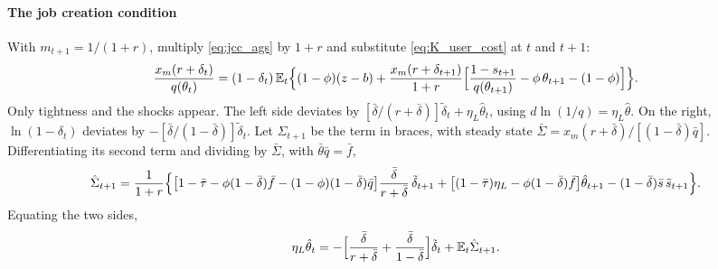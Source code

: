 \documentclass[authoryear, review, 12pt]{elsarticle}
\begin{document}
\paragraph{The job creation condition}
With $m_{t+1}=1/(1+r)$, multiply \eqref{eq:jcc_ags} by $1+r$ and substitute
\eqref{eq:K_user_cost} at $t$ and $t+1$:
\[
	\frac{x_m(r+\delta_t)}{q(\theta_t)}
	=(1-\delta_t)\,\mathbb{E}_t\Bigl\{(1-\phi)(z-b)
	+\frac{x_m(r+\delta_{t+1})}{1+r}\Bigl[\frac{1-s_{t+1}}{q(\theta_{t+1})}-\phi\,\theta_{t+1}-(1-\phi)\Bigr]\Bigr\}.
\]
Only tightness and the shocks appear. The left side deviates by
$[\bar\delta/(r+\bar\delta)]\tilde\delta_t+\eta_L\hat\theta_t$, using
$d\ln(1/q)=\eta_L\hat\theta$. On the right, $\ln(1-\delta_t)$ deviates by
$-[\bar\delta/(1-\bar\delta)]\tilde\delta_t$. Let $\Sigma_{t+1}$ be the term in braces, with
steady state $\bar\Sigma=x_m(r+\bar\delta)/[(1-\bar\delta)\bar{q}]$. Differentiating its second
term and dividing by $\bar\Sigma$, with $\bar\theta\bar{q}=\bar{f}$,
\[
	\hat\Sigma_{t+1}=\frac{1}{1+r}\Bigl\{\bigl[1-\bar\tau-\phi(1-\bar\delta)\bar{f}-(1-\phi)(1-\bar\delta)\bar{q}\bigr]\frac{\bar\delta}{r+\bar\delta}\,\tilde\delta_{t+1}
	+\bigl[(1-\bar\tau)\eta_L-\phi(1-\bar\delta)\bar{f}\bigr]\hat\theta_{t+1}
	-(1-\bar\delta)\bar{s}\,\tilde{s}_{t+1}\Bigr\}.
\]
Equating the two sides,
\begin{equation}\label{eq:jcc_fe_ll}
	\eta_L\hat\theta_t
	=-\Bigl[\frac{\bar\delta}{r+\bar\delta}+\frac{\bar\delta}{1-\bar\delta}\Bigr]\tilde\delta_t
	+\mathbb{E}_t\hat\Sigma_{t+1}.
\end{equation}
\end{document}
